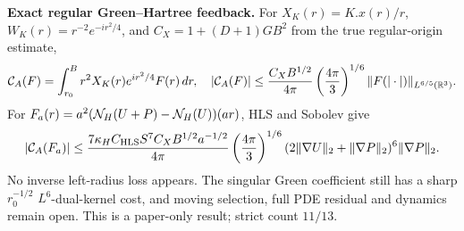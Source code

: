 \medskip
\noindent\textbf{Exact regular Green--Hartree feedback.}
For $X_K(r)=K.x(r)/r$, $W_K(r)=r^{-2}e^{-ir^2/4}$, and
$C_X=1+(D+1)GB^2$ from the true regular-origin estimate,
\[
{\cal C}_A(F)=\int_{r_0}^B r^2X_K(r)e^{ir^2/4}F(r)\,dr,
\quad
|{\cal C}_A(F)|\le
\frac{C_XB^{1/2}}{4\pi}\left(\frac{4\pi}{3}\right)^{1/6}
\|F(|\cdot|)\|_{L^{6/5}(\mathbb R^3)}.
\]
For $F_a(r)=a^2({\cal N}_H(U+P)-{\cal N}_H(U))(ar)$,
HLS and Sobolev give
\[
|{\cal C}_A(F_a)|\le
\frac{7\kappa_H C_{\rm HLS}S^7 C_X B^{1/2}a^{-1/2}}{4\pi}
\left(\frac{4\pi}{3}\right)^{1/6}
(2\|\nabla U\|_2+\|\nabla P\|_2)^6\|\nabla P\|_2.
\]
No inverse left-radius loss appears. The singular Green coefficient
still has a sharp $r_0^{-1/2}$ $L^6$-dual-kernel cost,
and moving selection, full PDE residual and dynamics remain open.
This is a paper-only result; strict count $11/13$.